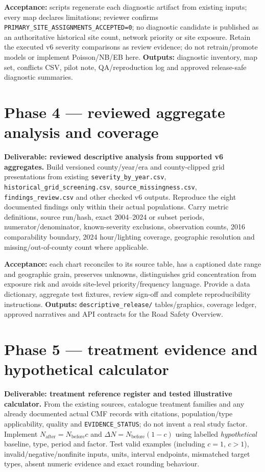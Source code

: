 \documentclass[11pt,a4paper,openany]{report}
\newcommand{\pathcode}[1]{\nolinkurl{#1}}
\begin{document}
\textbf{Acceptance:} scripts regenerate each diagnostic artifact from existing inputs; every map declares limitations; reviewer confirms \pathcode{PRIMARY_SITE_ASSIGNMENTS_ACCEPTED=0}; no diagnostic candidate is published as an authoritative historical site count, network priority or site exposure. Retain the executed v6 severity comparisons as review evidence; do not retrain/promote models or implement Poisson/NB/EB here. \textbf{Outputs:} diagnostic inventory, map set, conflicts CSV, pilot note, QA/reproduction log and approved release-safe diagnostic summaries.

\section{Phase 4 --- reviewed aggregate analysis and coverage}
\textbf{Deliverable: reviewed descriptive analysis from supported v6 aggregates.} Build versioned county/year/era and county-clipped grid presentations from existing \pathcode{severity_by_year.csv}, \pathcode{historical_grid_screening.csv}, \pathcode{source_missingness.csv}, \pathcode{findings_review.csv} and other checked v6 outputs. Reproduce the eight documented findings only within their actual populations. Carry metric definitions, source run/hash, exact 2004--2024 or subset periods, numerator/denominator, known-severity exclusions, observation counts, 2016 comparability boundary, 2024 hour/lighting coverage, geographic resolution and missing/out-of-county count where applicable.

\textbf{Acceptance:} each chart reconciles to its source table, has a captioned date range and geographic grain, preserves unknowns, distinguishes grid concentration from exposure risk and avoids site-level priority/frequency language. Provide a data dictionary, aggregate test fixtures, review sign-off and complete reproducibility instructions. \textbf{Outputs:} \pathcode{descriptive_release/} tables/graphics, coverage ledger, approved narratives and API contracts for the Road Safety Overview.

\section{Phase 5 --- treatment evidence and hypothetical calculator}
\textbf{Deliverable: treatment reference register and tested illustrative calculator.} From the existing sources, catalogue treatment families and any already documented actual CMF records with citations, population/type applicability, quality and \pathcode{EVIDENCE_STATUS}; do not invent a real study factor. Implement \(N_{\mathrm{after}}=N_{\mathrm{before}}c\) and \(\Delta N=N_{\mathrm{before}}(1-c)\) using labelled \emph{hypothetical} baseline, type, period and factor. Test valid examples (including \(c=1\), \(c>1\)), invalid/negative/nonfinite inputs, units, interval endpoints, mismatched target types, absent numeric evidence and exact rounding behaviour.
\end{document}
